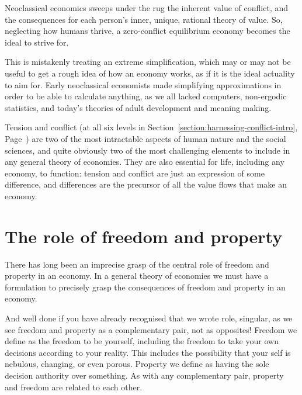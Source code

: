 Neoclassical economics  sweeps under the rug\cite{dowd-capitalism} the inherent value of conflict,  and the consequences for each person’s inner, unique, rational theory of value. So, neglecting how humans thrive, a zero-conflict equilibrium economy becomes the ideal to strive for.


This is mistakenly treating an extreme simplification, which may or may not be useful to get a rough idea of how an economy works, as if it is the ideal actuality\cite{thurow-dangerous} to aim for. Early neoclassical economists made simplifying approximations in order to be able to calculate anything, as we all lacked computers, non-ergodic statistics, and today’s theories of adult development and meaning making. 


Tension and conflict  (at all six levels in Section~\ref{section:harnessing-conflict-intro}, Page~\pageref{section:harnessing-conflict-intro}) are two of the most intractable aspects of human nature and the social sciences, and quite obviously two of the most challenging elements to include in any general theory of economies. They are also essential for life, including any economy, to function: tension and conflict are just an expression of some difference, and differences are the precursor of all the value flows that make an economy. 




\section{The role of freedom and property}
There has long been an imprecise grasp of the central role of freedom  and property in an economy.  In a general theory of economies  we must have a formulation to precisely grasp the consequences of freedom and property in an economy.


And well done if you have already recognised that we wrote role, singular, as we see freedom and property as a complementary pair,   not as opposites! Freedom  we define as the freedom to be yourself, including the freedom to take your own decisions according to your reality. This includes the possibility that your self is nebulous, changing, or even porous. Property  we define as having the sole decision authority over something. As with any complementary pair, property and freedom are related to each other.


